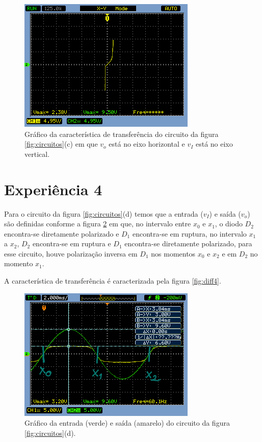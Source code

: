 \documentclass{abntex2}
\begin{document}
\begin{figure}[h]
  \centering
  \includegraphics[width=.8\textwidth]{diferenca-1c.png}
  \caption{Gráfico da característica de transferência do circuito da figura \ref{fig:circuitos}(c) em que $v_o$ está no eixo horizontal e $v_I$ está no eixo vertical.}
  \label{fig:diff3}
\end{figure}

\section{Experiência 4}

Para o circuito da figura \ref{fig:circuitos}(d) temos que a entrada ($v_I$) e saída ($v_o$) são definidas conforme a figura \ref{fig:io4}  em que, no intervalo entre $x_0$ e $x_1$, o diodo $D_2$ encontra-se diretamente polarizado e $D_1$ encontra-se em ruptura, no intervalo $x_1$ a $x_2$, $D_2$ encontra-se em ruptura e $D_1$ encontra-se diretamente polarizado, para esse circuito, houve polarização inversa em $D_1$ nos momentos $x_0$ e $x_2$ e em $D_2$ no momento $x_1$.

A característica de transferência é caracterizada pela figura \ref{fig:diff4}.

\begin{figure}[h]
  \centering
  \includegraphics[width=.8\textwidth]{circuito-1d-esboco2.png}
  \caption{Gráfico da entrada (verde) e saída (amarelo) do circuito da figura \ref{fig:circuitos}(d).}
  \label{fig:io4}
\end{figure}
\end{document}
